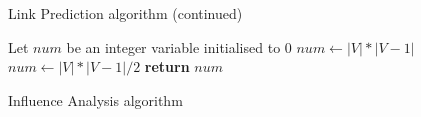 \documentclass[a4paper]{article}
\begin{document}
\clearpage

\begin{algorithm}
\ContinuedFloat
\caption{Link Prediction algorithm (continued)}
\begin{algorithmic}[1]
    \State Let $num$ be an integer variable initialised to 0
        \State $num \gets |V| * |V - 1|$
    \Else
        \State $num \gets |V| * |V - 1| / 2$ 
    \EndIf \label{lp_Gendif}
    \State \textbf{return} $num$
\EndProcedure
\end{algorithmic}
\end{algorithm}


\begin{algorithm}
\caption{Influence Analysis algorithm}\label{algo:ia}


\end{algorithm}
\end{document}
